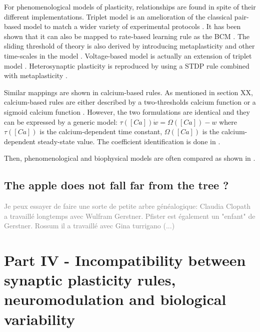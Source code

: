 For phenomenological models of plasticity, relationships are found in spite of their different implementations. Triplet model is an amelioration of the classical pair-based model to match a wider variety of experimental protocols \citep{pfister_triplets_2006}. It has been shown that it can also be mapped to rate-based learning rule as the BCM \citep{gjorgjieva_triplet_2011}. The sliding threshold of \citep{bienenstock_theory_1982} theory is also derived by introducing metaplasticity and other time-scales in the model \citep{el_boustani_stable_2012}.
Voltage-based model is actually an extension of triplet model \citep{clopath_connectivity_2010}. Heterosynaptic plasticity is reproduced by using a STDP rule combined with metaplasticity \citep{benuskova_stdp_2007}.

Similar mappings are shown in calcium-based rules. As mentioned in section XX, calcium-based rules are either described by a two-thresholds calcium function \citep{graupner_natural_2016} or a sigmoid calcium function \citep{shouval_converging_2002}. However, the two formulations are identical and they can be expressed by a generic model: $\tau([Ca]) \dot{w} = \Omega([Ca]) - w$ where $\tau([Ca])$ is the calcium-dependent time constant, $\Omega([Ca])$ is the calcium-dependent steady-state value. The coefficient identification is done in \citep{jacquerie_switches_2022}.

Then, phenomenological and biophysical models are often compared as shown in \citep{yeung_selectivity_2003, graupner_natural_2016, graupner_natural_2016, babadi_stability_2016}. 

\subsection{The apple does not fall far from the tree ?}
\textcolor{gray}{Je peux essayer de faire une sorte de petite arbre généalogique: Claudia Clopath a travaillé longtemps avec Wulfram Gerstner. Pfister est également un "enfant" de Gerstner. Rossum il a travaillé avec Gina turrigano (...) }


 
%
%
\section{Part IV - Incompatibility between synaptic plasticity rules, neuromodulation and biological variability}


